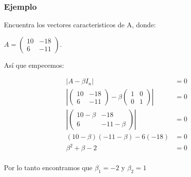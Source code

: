 \documentclass[12pt]{report}                                    %
\begin{document}
            \clearpage
            \subsubsection{Ejemplo}
            Encuentra los vectores caracteristicos de A, donde:

            $A = \begin{pmatrix}10&-18\\6&-11\end{pmatrix}$.

            Así que empecemos:

            \begin{equation*}
            \begin{split}
                \left|A - \beta I_n \right| &= 0 \\
                \left|\begin{pmatrix}10&-18\\6&-11\end{pmatrix} - \beta \begin{pmatrix}1&0\\0&1\end{pmatrix}\right| &= 0 \\
                \left|\begin{pmatrix}10 -\beta&-18\\6&-11-\beta\end{pmatrix} \right| &= 0 \\
                (10-\beta)(-11 -\beta) -6(-18)  &= 0 \\
                \beta^2 + \beta -2 &= 0 \\
            \end{split}
            \end{equation*}

            Por lo tanto encontramos que $\beta_1 = -2 $ y $ \beta_2 = 1$
\end{document}
